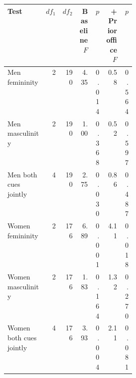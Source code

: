 \begin{tabular}{p{0.30\linewidth}rrrrrr}
\toprule
Test & $df_1$ & $df_2$ & Baseline $F$ & $p$ & + Prior office $F$ & $p$ \\
\midrule
Men femininity & 2 & 190 & 4.35 & 0.014 & 0.58 & 0.564 \\
Men masculinity & 2 & 190 & 1.00 & 0.368 & 0.52 & 0.597 \\
Men both cues jointly & 4 & 190 & 2.75 & 0.030 & 0.86 & 0.487 \\
Women femininity & 2 & 176 & 6.89 & 0.001 & 4.11 & 0.018 \\
Women masculinity & 2 & 176 & 1.83 & 0.164 & 1.32 & 0.270 \\
Women both cues jointly & 4 & 176 & 3.93 & 0.004 & 2.11 & 0.081 \\
\bottomrule
\end{tabular}
